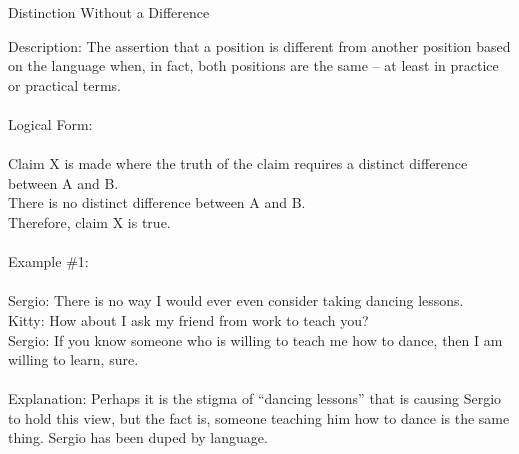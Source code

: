 \documentclass[a4paper,12pt,single,pdftex]{scrartcl}
\begin{document}
  

Distinction Without a Difference
    
      Description: The assertion that a position is different from another position based on the language when, in fact, both positions are the same -- at least in practice or practical terms.
    \\

    
      
    \\

    
      Logical Form:
    \\

    
      
    \\

    
      Claim X is made where the truth of the claim requires a distinct difference between A and B.
    \\

    
      There is no distinct difference between A and B.
    \\

    
      Therefore, claim X is true.
    \\

    
      
    \\

    
      Example \#1:
    \\

    
      
    \\

    
      Sergio: There is no way I would ever even consider taking dancing lessons.
    \\

    
      Kitty: How about I ask my friend from work to teach you?
    \\

    
      Sergio: If you know someone who is willing to teach me how to dance, then I am willing to learn, sure.
    \\

    
      
    \\

    
      Explanation: Perhaps it is the stigma of “dancing lessons” that is causing Sergio to hold this view, but the fact is, someone teaching him how to dance is the same thing.  Sergio has been duped by language.
    \\
\end{document}
